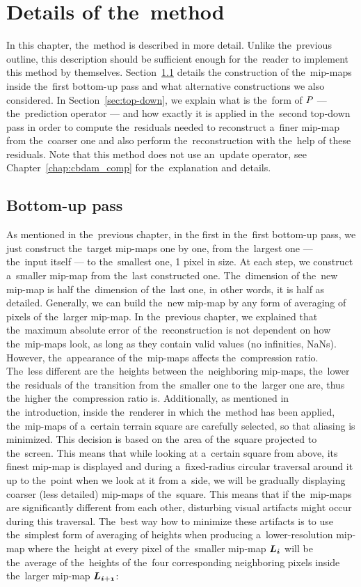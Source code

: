 \chapter{Details of the~method}\label{chap:details}

In this chapter, the~method is described in more detail. Unlike the~previous outline, this description should be sufficient enough for the~reader to implement this method by themselves. Section~\ref{sec:bottom-up} details the construction of the~mip-maps inside the~first bottom-up pass and what alternative constructions we also considered. In Section~\ref{sec:top-down}, we explain what is the~form of $\mathit{P_{}}$ --- the~prediction operator --- and how exactly it is applied in the~second top-down pass in order to compute the~residuals needed to reconstruct a~finer mip-map from the~coarser one and also perform the~reconstruction with the~help of these residuals. Note that this method does not use an~update operator, see Chapter~\ref{chap:cbdam_comp} for the~explanation and details.

\section{Bottom-up pass}\label{sec:bottom-up}
As mentioned in the~previous chapter, in the first in the~first bottom-up pass, we just construct the~target mip-maps one by one, from the~largest one --- the~input itself --- to the~smallest one, 1 pixel in size. At each step, we construct a~smaller mip-map from the~last constructed one. The~dimension of the~new mip-map is half the~dimension of the~last one, in other words, it is half as detailed. Generally, we can build the~new mip-map by any form of averaging of pixels of the~larger mip-map. In the~previous chapter, we explained that the~maximum absolute error of the~reconstruction is not dependent on how the~mip-maps look, as long as they contain valid values (no infinities, NaNs). However, the~appearance of the~mip-maps affects the~compression ratio. The~less different are the~heights between the~neighboring mip-maps, the~lower the~residuals of the~transition from the~smaller one to the~larger one are, thus the~higher the~compression ratio is. Additionally, as mentioned in the~introduction, inside the~renderer in which the~method has been applied, the~mip-maps of a~certain terrain square are carefully selected, so that aliasing is minimized. This decision is based on the~area of the~square projected to the~screen. This means that while looking at a~certain square from above, its finest mip-map is displayed and during a~fixed-radius circular traversal around it up to the~point when we look at it fro\textsl{}m a~side, we will be gradually displaying coarser (less detailed) mip-maps of the~square. This means that if the~mip-maps are significantly different from each other, disturbing visual artifacts might occur during this traversal. The~best way how to minimize these artifacts is to use the~simplest form of averaging of heights when producing a~lower-resolution mip-map where the~height at every pixel of the~smaller mip-map $\lnorm{i}$ will be the~average of the~heights of the~four corresponding neighboring pixels inside the~larger mip-map $\lnorm{i+1}$:

